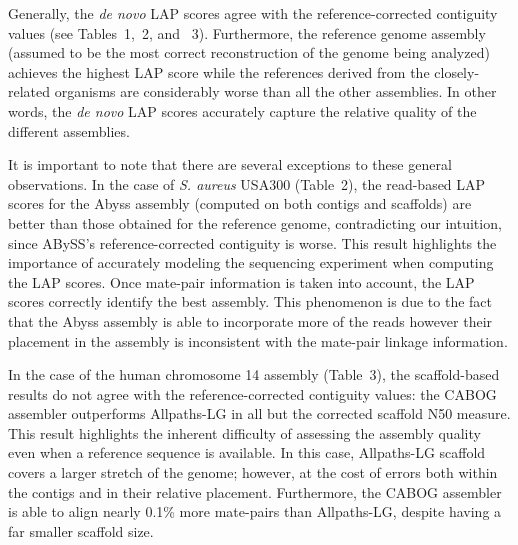 Generally, the \emph{de novo} LAP scores agree with the reference-corrected contiguity
values (see Tables~1,~2, and ~3).  Furthermore, the reference genome assembly (assumed to be the
most correct reconstruction of the genome being analyzed) achieves the
highest LAP score while the references derived from the closely-related
organisms are considerably worse than all the other assemblies.  In
other words, the \emph{de novo} LAP scores accurately capture the
relative quality of the different assemblies.

It is important to note that there are several exceptions to
these general observations. In the case of \emph{S. aureus} USA300 (Table~2),
the read-based LAP scores for the Abyss assembly (computed on both
contigs and scaffolds) are better than those obtained for the
reference genome, contradicting our intuition, since ABySS's reference-corrected contiguity is
worse. This result highlights the importance of accurately modeling
the sequencing experiment when computing the LAP scores.  Once
mate-pair information is taken into account, the LAP scores correctly
identify the best assembly.  This phenomenon is due to the fact that
the Abyss assembly is able to incorporate more of the reads however
their placement in the assembly is inconsistent with the mate-pair
linkage information.

In the case of the human chromosome 14 assembly (Table~3), the scaffold-based
results do not agree with the reference-corrected contiguity values: the CABOG assembler outperforms Allpaths-LG in all but the
corrected scaffold N50 measure. This result highlights the inherent
difficulty of assessing the assembly quality even when a reference
sequence is available.  In this case, Allpaths-LG scaffold covers a
larger stretch of the genome; however, at the cost of errors both within the
contigs and in their relative placement.
Furthermore, the CABOG assembler is able to align nearly 0.1\% more mate-pairs than Allpaths-LG, despite having a far smaller scaffold size.

